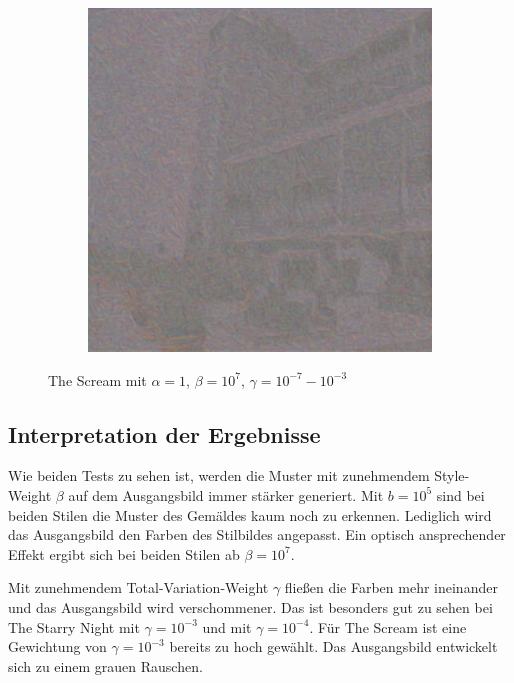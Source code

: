 \begin{figure}[H]
\begin{subfigure}[h]{0.15\textwidth}
    \end{subfigure}
    \begin{subfigure}[h]{0.15\textwidth}
        \centering
        \includegraphics[width=\textwidth]{resources/content/experiments/b__the_scream__768x768__style-weight_1e+07__tv-weight_1e-03.jpg}
    \end{subfigure}
    \caption{The Scream mit $ \alpha = 1 $, $ \beta = 10^{7} $, $ \gamma = 10^{-7} - 10^{-3} $}
\end{figure}

\pagebreak

\subsection{Interpretation der Ergebnisse}

Wie beiden Tests zu sehen ist, werden die Muster mit zunehmendem Style-Weight $ \beta $ auf dem Ausgangsbild immer stärker generiert. Mit $ b = 10^{5} $ sind bei beiden Stilen die Muster des Gemäldes kaum noch zu erkennen. Lediglich wird das Ausgangsbild den Farben des Stilbildes angepasst. Ein optisch ansprechender Effekt ergibt sich bei beiden Stilen ab $ \beta = 10^{7} $. 

Mit zunehmendem Total-Variation-Weight $ \gamma $ fließen die Farben mehr ineinander und das Ausgangsbild wird verschommener. Das ist besonders gut zu sehen bei The Starry Night mit $ \gamma = 10^{-3} $ und  mit $ \gamma = 10^{-4} $. Für The Scream ist eine Gewichtung von $ \gamma = 10^{-3} $ bereits zu hoch gewählt. Das Ausgangsbild entwickelt sich zu einem grauen Rauschen.


